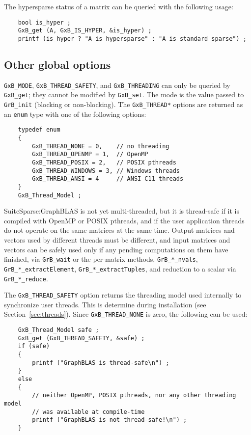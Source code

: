 \documentclass[12pt]{article}
\begin{document}
The hypersparse status of a matrix can be queried with the following usage:

{\footnotesize
\begin{verbatim}
    bool is_hyper ;
    GxB_get (A, GxB_IS_HYPER, &is_hyper) ;
    printf (is_hyper ? "A is hypersparse" : "A is standard sparse") ; \end{verbatim}}

\subsection{Other global options}

\verb'GxB_MODE', \verb'GxB_THREAD_SAFETY', and \verb'GxB_THREADING' can only be
queried by \verb'GxB_get'; they cannot be modified by \verb'GxB_set'.  The mode
is the value passed to \verb'GrB_init' (blocking or non-blocking).  The
\verb'GxB_THREAD*' options are returned as an \verb'enum' type with one of the
following options:

{\footnotesize
\begin{verbatim}
    typedef enum
    {
        GxB_THREAD_NONE = 0,    // no threading
        GxB_THREAD_OPENMP = 1,  // OpenMP
        GxB_THREAD_POSIX = 2,   // POSIX pthreads
        GxB_THREAD_WINDOWS = 3, // Windows threads
        GxB_THREAD_ANSI = 4     // ANSI C11 threads
    }
    GxB_Thread_Model ; \end{verbatim} }

SuiteSparse:GraphBLAS is not yet multi-threaded, but it is thread-safe if it is
compiled with OpenMP or POSIX pthreads, and if the user application threads do
not operate on the same matrices at the same time.  Output matrices and vectors
used by different threads must be different, and input matrices and vectors can
be safely used only if any pending computations on them have finished, via
\verb'GrB_wait' or the per-matrix methods, \verb'GrB_*_nvals',
\verb'GrB_*_extractElement', \verb'GrB_*_extractTuples', and reduction to a
scalar via \verb'GrB_*_reduce'.

The \verb'GxB_THREAD_SAFETY' option returns the threading model used internally
to synchronize user threads.  This is determine during installation (see
Section~\ref{sec:threads}).  Since \verb'GxB_THREAD_NONE' is zero, the
following can be used:

{\footnotesize
\begin{verbatim}
    GxB_Thread_Model safe ;
    GxB_get (GxB_THREAD_SAFETY, &safe) ;
    if (safe)
    {
        printf ("GraphBLAS is thread-safe\n") ;
    }
    else
    {
        // neither OpenMP, POSIX pthreads, nor any other threading model
        // was available at compile-time
        printf ("GraphBLAS is not thread-safe!\n") ;
    }
\end{verbatim} }
\end{document}
